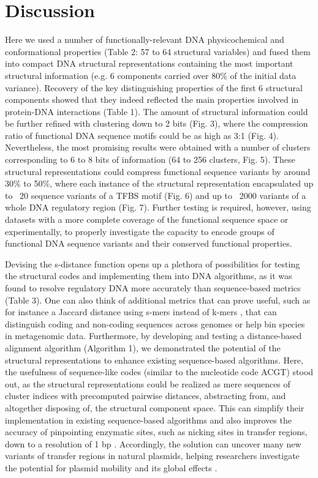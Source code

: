 \documentclass[10pt]{article}
\begin{document}
\section{Discussion}
Here we used a number of functionally-relevant DNA physicochemical and conformational properties (Table 2: 57 to 64 structural variables) and fused them into compact DNA structural representations containing the most important structural information (e.g. 6 components carried over 80\% of the initial data variance). Recovery of the key distinguishing properties of the first 6 structural components showed that they indeed reflected the main properties involved in protein-DNA interactions (Table 1). The amount of structural information could be further refined with clustering down to 2 bits (Fig. 3), where the compression ratio of functional DNA sequence motifs could be as high as 3:1 (Fig. 4). Nevertheless, the most promising results were obtained with a number of clusters corresponding to 6 to 8 bits of information (64 to 256 clusters, Fig. 5). These structural representations could compress functional sequence variants by around 30\% to 50\%, where each instance of the structural representation encapsulated up to ~20 sequence variants of a TFBS motif (Fig. 6) and up to ~2000 variants of a whole DNA regulatory region (Fig. 7). Further testing is required, however, using datasets with a more complete coverage of the functional sequence space or experimentally, to properly investigate the capacity to encode groups of functional DNA sequence variants and their conserved functional properties. 

Devising the s-distance function opens up a plethora of possibilities for testing the structural codes and implementing them into DNA algorithms, as it was found to resolve regulatory DNA more accurately than sequence-based metrics \cite{Zrimec2020-wx,Zrimec2018-lx} (Table 3). One can also think of additional metrics that can prove useful, such as for instance a Jaccard distance using s-mers instead of k-mers \cite{Zrimec2020-wx}, that can distinguish coding and non-coding sequences across genomes or help bin species in metagenomic data. Furthermore, by developing and testing a distance-based alignment algorithm (Algorithm 1), we demonstrated the potential of the structural representations to enhance existing sequence-based algorithms. Here, the usefulness of sequence-like codes (similar to the nucleotide code ACGT) stood out, as the structural representations could be realized as mere sequences of cluster indices with precomputed pairwise distances, abstracting from, and altogether disposing of, the structural component space. This can simplify their implementation in existing sequence-based algorithms and also improves the accuracy of pinpointing enzymatic sites, such as nicking sites in transfer regions, down to a resolution of 1 bp \cite{Zrimec2020-wx}. Accordingly, the solution can uncover many new variants of transfer regions in natural plasmids, helping researchers investigate the potential for plasmid mobility and its global effects \cite{Zrimec2020-wx}.
\end{document}
